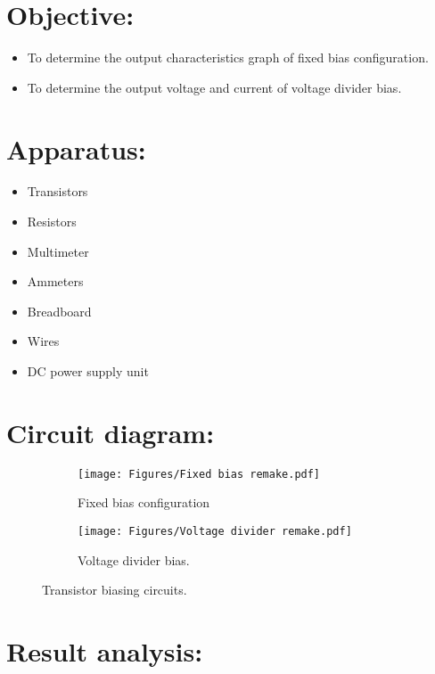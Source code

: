 \documentclass[a4paper, 12pt]{extarticle}
\begin{document}
\section{Objective:}
    \begin{itemize}
        \item To determine the output characteristics graph of fixed bias configuration.
        \item To determine the output voltage and current of voltage divider bias.
    \end{itemize}
\section{Apparatus:}
    \begin{itemize}
        \item Transistors
        \item Resistors
        \item Multimeter
        \item Ammeters
        \item Breadboard
        \item Wires
        \item DC power supply unit
    \end{itemize}
\section{Circuit diagram:}
    \begin{figure}[htbp]
    \centering
        \begin{subfigure}[h]{0.4\textwidth}
        \centering
            \texttt{[image: Figures/Fixed bias remake.pdf]}
            \caption{Fixed bias configuration}
            \label{fig:subfig01}
        \end{subfigure}
        \hfill
        \begin{subfigure}[h]{0.4\textwidth}
        \centering
            \texttt{[image: Figures/Voltage divider remake.pdf]}
            \caption{Voltage divider bias.}
            \label{fig:subfig02}
        \end{subfigure}
        \caption{Transistor biasing circuits.}
        \label{fig:1}
    \end{figure}

\newpage
\restoregeometry
{}
\section{Result analysis:}
\end{document}
